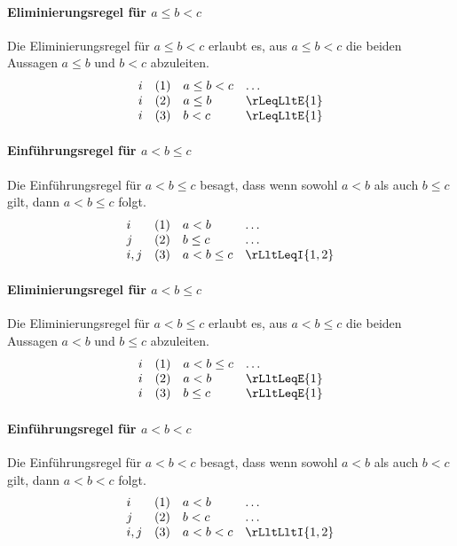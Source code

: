 \documentclass[main.tex]{subfiles}
\begin{document}
\paragraph{Eliminierungsregel für \(a \leq b < c\)}
Die Eliminierungsregel für \(a \leq b < c\) erlaubt es, aus \(a \leq b < c\) die beiden Aussagen \(a \leq b\) und \(b < c\) abzuleiten.
\[
\begin{array}{llll}
    i & (1) & a \leq b < c & \dots \\
    i & (2) & a \leq b & \rLeqLltE{1} \\
    i & (3) & b < c & \rLeqLltE{1}
\end{array}
\]

\paragraph{Einführungsregel für \(a < b \leq c\)}
Die Einführungsregel für \(a < b \leq c\) besagt, dass wenn sowohl \(a < b\) als auch \(b \leq c\) gilt, dann \(a < b \leq c\) folgt.
\[
\begin{array}{llll}
    i   & (1) & a < b & \dots \\
    j   & (2) & b \leq c & \dots \\
    i,j & (3) & a < b \leq c & \rLltLeqI{1,2}
\end{array}
\]

\paragraph{Eliminierungsregel für \(a < b \leq c\)}
Die Eliminierungsregel für \(a < b \leq c\) erlaubt es, aus \(a < b \leq c\) die beiden Aussagen \(a < b\) und \(b \leq c\) abzuleiten.
\[
\begin{array}{llll}
    i & (1) & a < b \leq c & \dots \\
    i & (2) & a < b & \rLltLeqE{1} \\
    i & (3) & b \leq c & \rLltLeqE{1}
\end{array}
\]

\paragraph{Einführungsregel für \(a < b < c\)}
Die Einführungsregel für \(a < b < c\) besagt, dass wenn sowohl \(a < b\) als auch \(b < c\) gilt, dann \(a < b < c\) folgt.
\[
\begin{array}{llll}
    i   & (1) & a < b & \dots \\
    j   & (2) & b < c & \dots \\
    i,j & (3) & a < b < c & \rLltLltI{1,2}
\end{array}
\]
\end{document}
